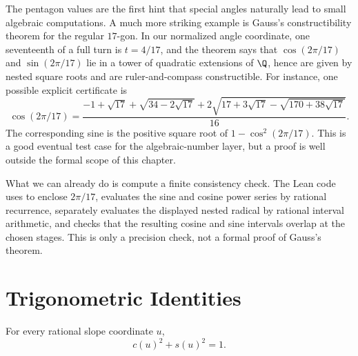 \begin{remark}
\leanok
The pentagon values are the first hint that special angles naturally lead to
small algebraic computations.  A much more striking example is Gauss's
constructibility theorem for the regular \(17\)-gon.  In our normalized angle
coordinate, one seventeenth of a full turn is \(t=4/17\), and the theorem says
that \(\cos(2\pi/17)\) and \(\sin(2\pi/17)\) lie in a tower of quadratic
extensions of \(\Q\), hence are given by nested square roots and are
ruler-and-compass constructible.  For instance, one possible explicit
certificate is
\[
\cos(2\pi/17)=
\frac{-1+\sqrt{17}+\sqrt{34-2\sqrt{17}}
  +2\sqrt{17+3\sqrt{17}-\sqrt{170+38\sqrt{17}}}}{16}.
\]
The corresponding sine is the positive square root of \(1-\cos^2(2\pi/17)\).
This is a good eventual test case for the algebraic-number layer, but a proof
is well outside the formal scope of this chapter.

What we can already do is compute a finite consistency check.  The Lean code
uses  to enclose \(2\pi/17\), evaluates the sine and cosine
power series by rational recurrence, separately evaluates the displayed
nested radical by rational interval arithmetic, and checks that the resulting
cosine and sine intervals overlap at the chosen stages.  This is only a
precision check, not a formal proof of Gauss's theorem.
\end{remark}

\section{Trigonometric Identities}

\begin{theorem}
\label{thm:rational-circle-pythagorean}
\leanok
For every rational slope coordinate \(u\),
\[
  c(u)^2+s(u)^2=1.
\]
\end{theorem}

